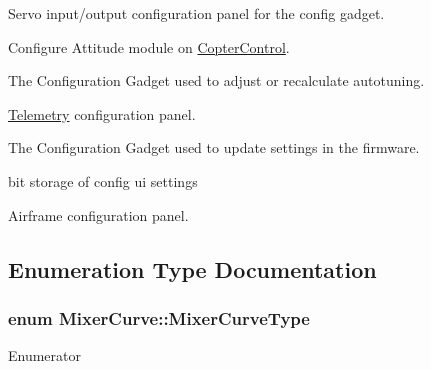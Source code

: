 Servo input/output configuration panel for the config gadget.

Configure Attitude module on \hyperlink{class_copter_control}{Copter\-Control}.

The Configuration Gadget used to adjust or recalculate autotuning.

\hyperlink{class_telemetry}{Telemetry} configuration panel.

The Configuration Gadget used to update settings in the firmware.

bit storage of config ui settings

Airframe configuration panel.

\subsection{Enumeration Type Documentation}
\hypertarget{group___config_plugin_ga58a5506035df5fabbf4feffb36632595}{
\subsubsection[{Mixer\-Curve\-Type}]{\setlength{\rightskip}{0pt plus 5cm}enum {\bf Mixer\-Curve\-::\-Mixer\-Curve\-Type}}}\label{group___config_plugin_ga58a5506035df5fabbf4feffb36632595}
\begin{Desc}
\item[Enumerator]\par
\begin{description}
\item[{\em 
\hypertarget{group___config_plugin_gga58a5506035df5fabbf4feffb36632595a7dbbc543ccc2e9b4f8ba98d66717a836}{M\-I\-X\-E\-R\-C\-U\-R\-V\-E\-\_\-\-T\-H\-R\-O\-T\-T\-L\-E}\label{group___config_plugin_gga58a5506035df5fabbf4feffb36632595a7dbbc543ccc2e9b4f8ba98d66717a836}
}]\item[{\em 
\hypertarget{group___config_plugin_gga58a5506035df5fabbf4feffb36632595adc44b10adb428e4fdde5f964bbc339b8}{M\-I\-X\-E\-R\-C\-U\-R\-V\-E\-\_\-\-O\-T\-H\-E\-R}\label{group___config_plugin_gga58a5506035df5fabbf4feffb36632595adc44b10adb428e4fdde5f964bbc339b8}
}]\end{description}
\end{Desc}


